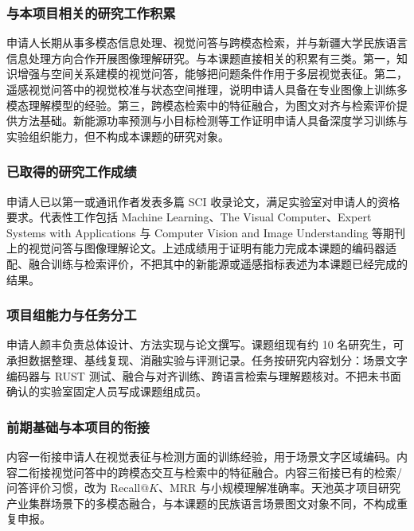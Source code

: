 \justifying
\NSFCBodyText

\subsubsection{与本项目相关的研究工作积累}

申请人长期从事多模态信息处理、视觉问答与跨模态检索，并与新疆大学民族语言信息处理方向合作开展图像理解研究。与本课题直接相关的积累有三类。第一，知识增强与空间关系建模的视觉问答，能够把问题条件作用于多层视觉表征\cite{yan2024knowledge,yan2022spca}。第二，遥感视觉问答中的视觉校准与状态空间推理，说明申请人具备在专业图像上训练多模态理解模型的经验\cite{xu2026rshr,xu2026rssr}。第三，跨模态检索中的特征融合，为图文对齐与检索评价提供方法基础。新能源功率预测与小目标检测等工作\cite{sun2025dwt,liu2026wavekan,wang2025syolo}证明申请人具备深度学习训练与实验组织能力，但不构成本课题的研究对象。

\subsubsection{已取得的研究工作成绩}

申请人已以第一或通讯作者发表多篇 SCI 收录论文，满足实验室对申请人的资格要求。代表性工作包括 Machine Learning、The Visual Computer、Expert Systems with Applications 与 Computer Vision and Image Understanding 等期刊上的视觉问答与图像理解论文\cite{yan2024knowledge,yan2022spca,xu2026rshr,xu2026rssr}。上述成绩用于证明有能力完成本课题的编码器适配、融合训练与检索评价，不把其中的新能源或遥感指标表述为本课题已经完成的结果。

\subsubsection{项目组能力与任务分工}

申请人颜丰负责总体设计、方法实现与论文撰写。课题组现有约 10 名研究生，可承担数据整理、基线复现、消融实验与评测记录。任务按研究内容划分：场景文字编码器与 RUST 测试、融合与对齐训练、跨语言检索与理解题核对。不把未书面确认的实验室固定人员写成课题组成员。

\subsubsection{前期基础与本项目的衔接}

内容一衔接申请人在视觉表征与检测方面的训练经验，用于场景文字区域编码。内容二衔接视觉问答中的跨模态交互与检索中的特征融合。内容三衔接已有的检索/问答评价习惯，改为 Recall@$K$、MRR 与小规模理解准确率。天池英才项目研究产业集群场景下的多模态融合，与本课题的民族语言场景图文对象不同，不构成重复申报。
